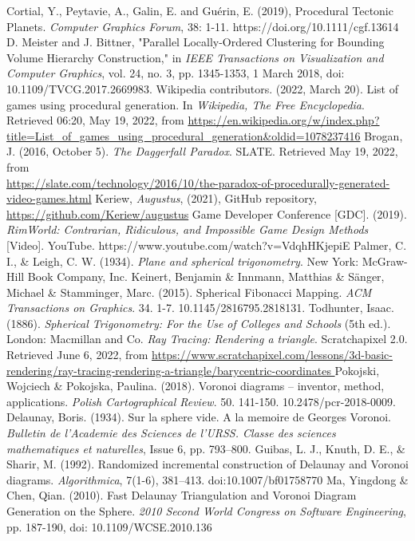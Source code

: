 \begin{thebibliography}{9}
Cortial, Y., Peytavie, A., Galin, E. and Guérin, E. (2019), Procedural Tectonic Planets. \textit{Computer Graphics Forum}, 38: 1-11. https://doi.org/10.1111/cgf.13614
D. Meister and J. Bittner, "Parallel Locally-Ordered Clustering for Bounding Volume Hierarchy Construction," in \textit{IEEE Transactions on Visualization and Computer Graphics}, vol. 24, no. 3, pp. 1345-1353, 1 March 2018, doi: 10.1109/TVCG.2017.2669983.
Wikipedia contributors. (2022, March 20). List of games using procedural generation. In \textit{Wikipedia, The Free Encyclopedia}. Retrieved 06:20, May 19, 2022, from \url{https://en.wikipedia.org/w/index.php?title=List\_of\_games\_using\_procedural\_generation\&oldid=1078237416}
Brogan, J. (2016, October 5). \textit{The Daggerfall Paradox}. SLATE. Retrieved May 19, 2022, from\\ \url{https://slate.com/technology/2016/10/the-paradox-of-procedurally-generated-video-games.html}
Keriew, \textit{Augustus}, (2021), GitHub repository, \url{https://github.com/Keriew/augustus}
Game Developer Conference [GDC]. (2019). \textit{RimWorld: Contrarian, Ridiculous, and Impossible Game Design Methods} [Video]. YouTube. https://www.youtube.com/watch?v=VdqhHKjepiE
Palmer, C. I., \& Leigh, C. W. (1934). \textit{Plane and spherical trigonometry}. New York: McGraw-Hill Book Company, Inc. 
Keinert, Benjamin  \& Innmann, Matthias \& Sänger, Michael \& Stamminger, Marc. (2015). Spherical Fibonacci Mapping. \textit{ACM Transactions on Graphics}. 34. 1-7. 10.1145/2816795.2818131. 
Todhunter, Isaac. (1886). \textit{Spherical Trigonometry: For the Use of Colleges and Schools} (5th ed.). London: Macmillan and Co.
\textit{Ray Tracing: Rendering a triangle}. Scratchapixel 2.0. Retrieved June 6, 2022, from \url{https://www.scratchapixel.com/lessons/3d-basic-rendering/ray-tracing-rendering-a-triangle/barycentric-coordinates }
Pokojski, Wojciech \& Pokojska, Paulina. (2018). Voronoi diagrams – inventor, method, applications. \textit{Polish Cartographical Review}. 50. 141-150. 10.2478/pcr-2018-0009. 
 Delaunay, Boris. (1934). Sur la sphere vide. A la memoire de Georges Voronoi. \textit{Bulletin de l’Academie des Sciences de l’URSS. Classe des sciences mathematiques et naturelles}, Issue 6, pp. 793–800.
 Guibas, L. J., Knuth, D. E., \& Sharir, M. (1992). Randomized incremental construction of Delaunay and Voronoi diagrams. \textit{Algorithmica}, 7(1-6), 381–413. doi:10.1007/bf01758770 
Ma,  Yingdong \& Chen, Qian. (2010). Fast Delaunay Triangulation and Voronoi Diagram Generation on the Sphere. \textit{2010 Second World Congress on Software Engineering},  pp. 187-190, doi: 10.1109/WCSE.2010.136
\end{thebibliography}